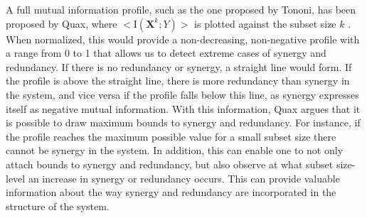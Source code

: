 \documentclass[../main.tex]{subfiles}
\begin{document}
A full mutual information profile, such as the one proposed by Tononi, has been proposed by Quax, where $< \mathrm{I}\left( \mathbf{X}^k;Y \right) >$ is plotted against the subset size $k$ \cite{QuaxPersonal, tononi1999measures}. 
When normalized, this would provide a non-decreasing, non-negative profile with a range from 0 to 1 that allows us to detect extreme cases of synergy and redundancy.
If there is no redundancy or synergy, a straight line would form.
If the profile is above the straight line, there is more redundancy than synergy in the system, and vice versa if the profile falls below this line, as synergy expresses itself as negative mutual information.
With this information, Quax argues that it is possible to draw maximum bounds to synergy and redundancy.
For instance, if the profile reaches the maximum possible value for a small subset size there cannot be synergy in the system.
In addition, this can enable one to not only attach bounds to synergy and redundancy, but also observe at what subset size-level an increase in synergy or redundancy occurs.
This can provide valuable information about the way synergy and redundancy are incorporated in the structure of the system.

\end{document}
